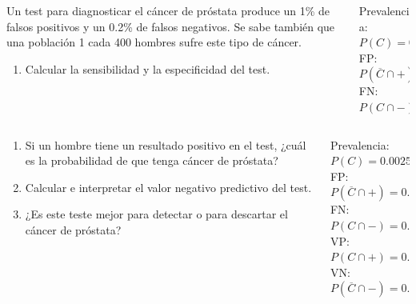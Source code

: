 \documentclass[aspectratio=169,10pt,t]{beamer}
\begin{document}
\begin{frame}
\begin{columns}
\begin{column}[T]{0.7\textwidth}
Un test para diagnosticar el cáncer de próstata produce un 1\% de falsos positivos y un 0.2\% de falsos negativos. Se sabe también que una población 1 cada 400 hombres sufre este tipo de cáncer.
\begin{enumerate}
\item Calcular la sensibilidad y la especificidad del test.
\end{enumerate}
\end{column}
\quad
\begin{column}[T]{0.3\textwidth}
\begin{datos}
Prevalencia: $P(C)=0.0025$\\
FP: $P(\overline C\cap +)=0.01$\\
FN: $P(C \cap -)=0.002$
\end{datos}
\end{column}
\end{columns}
\end{frame}


\begin{frame}
\begin{columns}
\begin{column}[T]{0.7\textwidth}
\begin{enumerate}
\item[2.] Si un hombre tiene un resultado positivo en el test, ¿cuál es la probabilidad de que tenga cáncer de próstata?
\item[3.] Calcular e interpretar el valor negativo predictivo del test.
\item[4.] ¿Es este teste mejor para detectar o para descartar el cáncer de próstata?
\end{enumerate}
\end{column}
\begin{column}[T]{0.3\textwidth}
\begin{datos}
Prevalencia: $P(C)=0.0025$\\
FP: $P(\overline C\cap +)=0.01$\\
FN: $P(C \cap -)=0.002$\\
VP: $P(C \cap +)=0.0005$\\
VN: $P(\overline C \cap -)=0.9875$
\end{datos}
\end{column}
\end{columns}
\end{frame}
\end{document}
